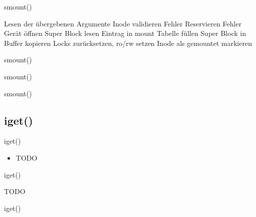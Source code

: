 \documentclass{beamer}
\begin{document}
\begin{frame}{smount()}
    \begin{algorithmic}[1]
        \State Lesen der übergebenen Argumente
        \State Inode validieren
             Fehler \EndIf
             Reservieren \EndIf
        \EndFor
         Fehler \EndIf
        \State Gerät öffnen
        \State Super Block lesen
        \State Eintrag in mount Tabelle füllen
        \State Super Block in Buffer kopieren
        \State Locks zurücksetzen, ro/rw setzen
        \State Inode als gemountet markieren
    \end{algorithmic}
\end{frame}

\begin{frame}{smount()}
\end{frame}

\begin{frame}{smount()}
\end{frame}

\begin{frame}{smount()}
\end{frame}




\subsection{iget()}

\begin{frame}{iget()}
    \begin{itemize}
        \item TODO
    \end{itemize}
\end{frame}

\begin{frame}{iget()}
    \begin{algorithmic}[1]
        \State TODO
    \end{algorithmic}
\end{frame}

\begin{frame}{iget()}
\end{frame}
\end{document}
